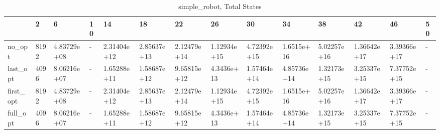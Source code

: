 \begin{table}
\caption{simple_robot, Total States}
\label{simple_robot_total}
\begin{tabular}{llllllllllllll}
\toprule
 & 2 & 6 & 10 & 14 & 18 & 22 & 26 & 30 & 34 & 38 & 42 & 46 & 50 \\
\midrule
no_opt & 8192 & 4.83729e+08 & - & 2.31404e+12 & 2.85637e+13 & 2.12479e+14 & 1.12934e+15 & 4.72392e+15 & 1.6515e+16 & 5.02257e+16 & 1.36642e+17 & 3.39366e+17 & - \\
last_opt & 4096 & 8.06216e+07 & - & 1.65288e+11 & 1.58687e+12 & 9.65815e+12 & 4.3436e+13 & 1.57464e+14 & 4.85736e+14 & 1.32173e+15 & 3.25337e+15 & 7.37752e+15 & - \\
first_opt & 8192 & 4.83729e+08 & - & 2.31404e+12 & 2.85637e+13 & 2.12479e+14 & 1.12934e+15 & 4.72392e+15 & 1.6515e+16 & 5.02257e+16 & 1.36642e+17 & 3.39366e+17 & - \\
full_opt & 4096 & 8.06216e+07 & - & 1.65288e+11 & 1.58687e+12 & 9.65815e+12 & 4.3436e+13 & 1.57464e+14 & 4.85736e+14 & 1.32173e+15 & 3.25337e+15 & 7.37752e+15 & - \\
\bottomrule
\end{tabular}
\end{table}
